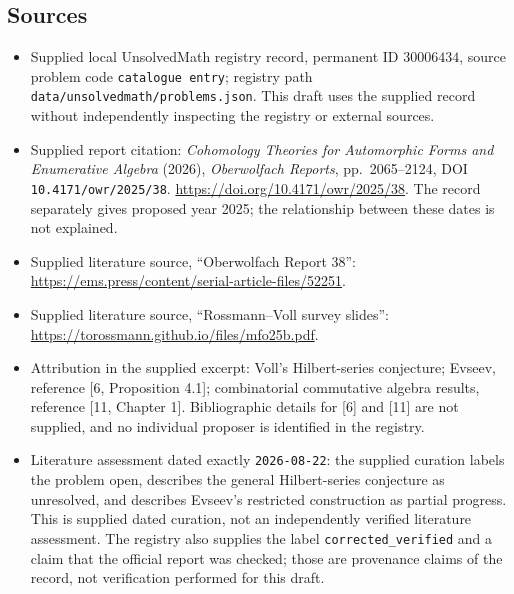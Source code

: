 \documentclass[11pt]{article}
\begin{document}
\subsection{Sources}
\begin{itemize}
\item Supplied local UnsolvedMath registry record, permanent ID \(30006434\), source problem code \texttt{catalogue entry}; registry path \texttt{data/unsolvedmath/problems.json}. This draft uses the supplied record without independently inspecting the registry or external sources.
\item Supplied report citation: \emph{Cohomology Theories for Automorphic Forms and Enumerative Algebra} (2026), \emph{Oberwolfach Reports}, pp.~2065--2124, DOI \texttt{10.4171/owr/2025/38}. \url{https://doi.org/10.4171/owr/2025/38}. The record separately gives proposed year 2025; the relationship between these dates is not explained.
\item Supplied literature source, ``Oberwolfach Report 38'': \url{https://ems.press/content/serial-article-files/52251}.
\item Supplied literature source, ``Rossmann--Voll survey slides'': \url{https://torossmann.github.io/files/mfo25b.pdf}.
\item Attribution in the supplied excerpt: Voll's Hilbert-series conjecture; Evseev, reference [6, Proposition 4.1]; combinatorial commutative algebra results, reference [11, Chapter 1]. Bibliographic details for [6] and [11] are not supplied, and no individual proposer is identified in the registry.
\item Literature assessment dated exactly \texttt{2026-08-22}: the supplied curation labels the problem open, describes the general Hilbert-series conjecture as unresolved, and describes Evseev's restricted construction as partial progress. This is supplied dated curation, not an independently verified literature assessment. The registry also supplies the label \texttt{corrected\_verified} and a claim that the official report was checked; those are provenance claims of the record, not verification performed for this draft.
\end{itemize}
\end{document}
